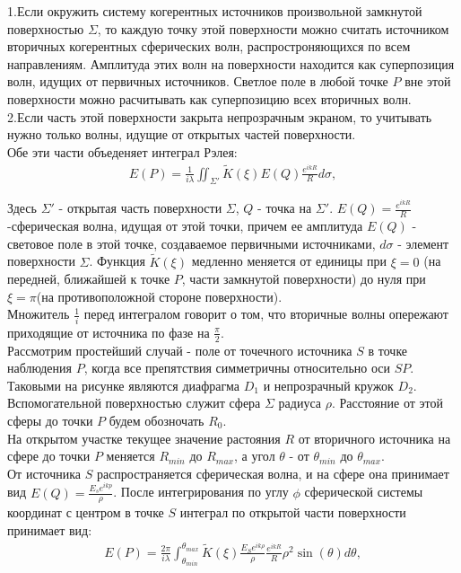 \documentclass[__main__.tex]{subfiles}
\begin{document}
1.Если окружить систему когерентных источников произвольной замкнутой поверхностью $\Sigma$, то каждую точку этой поверхности можно считать источником вторичных когерентных сферических волн, распростроняющихся по всем направлениям. Амплитуда этих волн на поверхности находится как суперпозиция волн, идущих от первичных источников. Светлое поле в любой точке $P$ вне этой поверхности можно расчитывать как суперпозицию всех вторичных волн.\\

2.Если часть этой поверхности закрыта непрозрачным экраном, то учитывать нужно только волны, идущие от открытых частей поверхности.\\

Обе эти части объеденяет интеграл Рэлея:
\begin{gather}
E(P)= \frac{1}{i\lambda}\iint_{\Sigma'} \tilde{K}(\xi)E(Q)\frac{e^{ikR}}{R}d\sigma ,
\end{gather}

Здесь $\Sigma'$ - открытая часть поверхности $\Sigma$, $Q$ - точка на $\Sigma'$. $E(Q)=\frac{e^{ikR}}{R}$ -сферическая волна, идущая от этой точки, причем ее амплитуда $E(Q)$ - световое поле в этой точке, создаваемое первичными источниками, $d\sigma$ - элемент поверхности $\Sigma$. Функция $\tilde{K}(\xi)$ медленно меняется от единицы при $\xi = 0$ (на передней, ближайшей к точке $P$, части замкнутой поверхности) до нуля при $\xi = \pi$(на противоположной стороне поверхности).\\

Множитель $\frac{1}{i} $ перед интегралом говорит о том, что вторичные волны опережают приходящие от источника по фазе на $\frac{\pi}{2}$.\\

Рассмотрим простейший случай - поле от точечного источника $S$ в точке наблюдения $P$, когда все препятствия симметричны относительно оси $SP$. Таковыми на рисунке являются диафрагма $D_1$ и непрозрачный кружок $D_2$. Вспомогательной поверхностью служит сфера $\Sigma$ радиуса $\rho$. Расстояние от этой сферы до точки $P$ будем обозночать $R_0$.\\

На открытом участке текущее значение растояния $R$ от вторичного источника на сфере до точки $P$ меняется $R_{min}$ до $R_{max}$, а угол $\theta$ - от $\theta_{min}$ до $\theta_{max}$.\\

От источника $S$ распространяется сферическая волна, и на сфере она принимает вид $E(Q)=\frac{E_s e^{ikp}}{\rho}$. После интегрирования по углу $\phi$ сферической системы координат с центром в точке $S$ интеграл по открытой части поверхности принимает вид:\\
\begin{gather}
E(P)=\frac{2\pi}{i\lambda} \int_{\theta_{min}}^{\theta_{max}} \tilde{K} (\xi) \frac{E_S e^{ik\rho}}{\rho} \frac{e^{ikR}}{R} \rho^2 \sin(\theta) d\theta ,
\end{gather}
\end{document}
